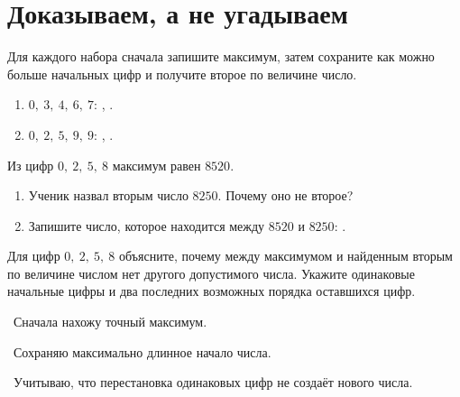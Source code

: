 \newpage
\section{Доказываем, а не угадываем}

\begin{practicebox}
  Для каждого набора сначала запишите максимум, затем сохраните как можно
  больше начальных цифр и получите второе по величине число.
  \begin{enumerate}[label=\textbf{\arabic*.}]
    \item \(0,\ 3,\ 4,\ 6,\ 7\): \answerblank[32mm], \answerblank[32mm].
    \item \(0,\ 2,\ 5,\ 9,\ 9\): \answerblank[32mm], \answerblank[32mm].
  \end{enumerate}
\end{practicebox}

\begin{warningbox}
  Из цифр \(0,\ 2,\ 5,\ 8\) максимум равен \(8520\).
  \begin{enumerate}[label=\textbf{\arabic*.}]
    \item Ученик назвал вторым число \(8250\). Почему оно не второе?
    \item Запишите число, которое находится между \(8520\) и \(8250\):
      \answerblank[35mm].
  \end{enumerate}
\end{warningbox}

\begin{checkpointbox}
  Для цифр \(0,\ 2,\ 5,\ 8\) объясните, почему между максимумом и найденным
  вторым по величине числом нет другого допустимого числа. Укажите одинаковые
  начальные цифры и два последних возможных порядка оставшихся цифр.
\end{checkpointbox}

\begin{reflectionbox}
  \choicebox\ Сначала нахожу точный максимум.

  \choicebox\ Сохраняю максимально длинное начало числа.

  \choicebox\ Учитываю, что перестановка одинаковых цифр не создаёт нового
  числа.
\end{reflectionbox}
